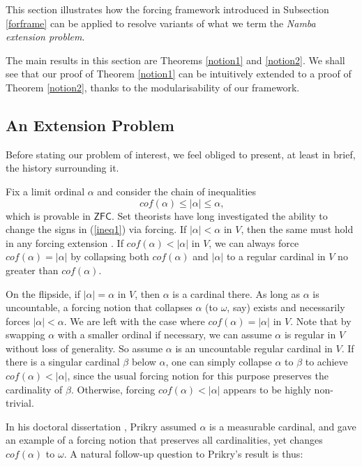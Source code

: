 \documentclass[12pt]{article}
\numberwithin{equation}{section}
\begin{document}
This section illustrates how the forcing framework introduced in Subsection \ref{forframe} can be applied to resolve variants of what we term the \textit{Namba extension problem}.

The main results in this section are Theorems \ref{notion1} and \ref{notion2}. We shall see that our proof of Theorem \ref{notion1} can be intuitively extended to a proof of Theorem \ref{notion2}, thanks to the modularisability of our framework.

\subsection{An Extension Problem}

Before stating our problem of interest, we feel obliged to present, at least in brief, the history surrounding it. 

Fix a limit ordinal $\alpha$ and consider the chain of inequalities
\begin{equation}\label{ineq1}
    cof(\alpha) \leq |\alpha| \leq \alpha \text{,}
\end{equation} 
which is provable in $\mathsf{ZFC}$. Set theorists have long investigated the ability to change the signs in (\ref{ineq1}) via forcing. If $|\alpha| < \alpha$ in $V$, then the same must hold in any forcing extension . If $cof(\alpha) < |\alpha|$ in $V$, we can always force $cof(\alpha) = |\alpha|$ by collapsing both $cof(\alpha)$ and $|\alpha|$ to a regular cardinal in $V$ no greater than $cof(\alpha)$.

On the flipside, if $|\alpha| = \alpha$ in $V$, then $\alpha$ is a cardinal there. As long as $\alpha$ is uncountable, a forcing notion that collapses $\alpha$ (to $\omega$, say) exists and necessarily forces $|\alpha| < \alpha$. We are left with the case where $cof(\alpha) = |\alpha|$ in $V$. Note that by swapping $\alpha$ with a smaller ordinal if necessary, we can assume $\alpha$ is regular in $V$ without loss of generality. So assume $\alpha$ is an uncountable regular cardinal in $V$. If there is a singular cardinal $\beta$ below $\alpha$, one can simply collapse $\alpha$ to $\beta$ to achieve $cof(\alpha) < |\alpha|$, since the usual forcing notion for this purpose preserves the cardinality of $\beta$. Otherwise, forcing $cof(\alpha) < |\alpha|$ appears to be highly non-trivial.

In his doctoral dissertation \cite{prikry}, Prikry assumed $\alpha$ is a measurable cardinal, and gave an example of a forcing notion that preserves all cardinalities, yet changes $cof(\alpha)$ to $\omega$. A natural follow-up question to Prikry's result is thus:
\end{document}
